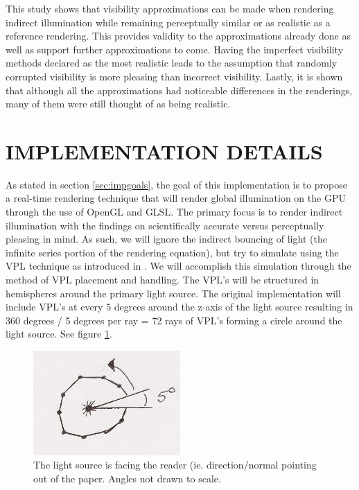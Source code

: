 This study shows that visibility approximations can be made when rendering indirect illumination while remaining perceptually similar or as realistic as a reference rendering.  This provides validity to the approximations already done as well as support further approximations to come.  Having the imperfect visibility methods declared as the most realistic leads to the assumption that randomly corrupted visibility is more pleasing than incorrect visibility.  Lastly, it is shown that although all the approximations had noticeable differences in the renderings, many of them were still thought of as being realistic.

\section{IMPLEMENTATION DETAILS} \label{sec:impdetails}

As stated in section \ref{sec:impgoals}, the goal of this implementation is to propose a real-time rendering technique that will render global illumination on the GPU through the use of OpenGL and GLSL.  The primary focus is to render indirect illumination with the findings on scientifically accurate versus perceptually pleasing in mind.  As such, we will ignore the indirect bouncing of light (the infinite series portion of the rendering equation), but try to simulate using the VPL technique as introduced in \cite{Keller1997}.  We will accomplish this simulation through the method of VPL placement and handling.  The VPL's will be structured in hemispheres around the primary light source.  The original implementation will include VPL's at every $5$ degrees around the z-axis of the light source resulting in 360 degrees / 5 degrees per ray = 72 rays of VPL's forming a circle around the light source. See figure \ref{fig:3.1}.

\begin{figure}[h!]
  \centering
    \includegraphics[width=0.5\textwidth]{Figure31.jpg}
  \caption{The light source is facing the reader (ie. direction/normal pointing out of the paper. Angles not drawn to scale.}
	\label{fig:3.1}
\end{figure}


